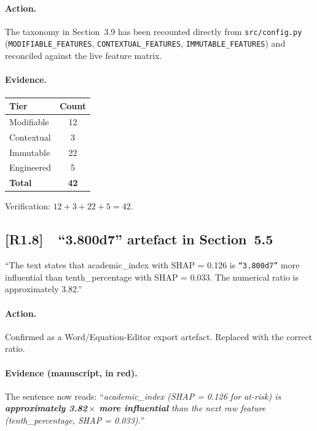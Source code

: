 \documentclass[11pt,a4paper]{article}
\newcommand{\cid}[1]{\textcolor{revred}{\textbf{[#1]}}}
\newcommand{\filebox}[1]{\texttt{\small #1}}
\newcommand{\sectref}[1]{Section~#1}
\newcommand{\stress}[1]{\textbf{#1}}
\begin{document}
\begin{itemize}
\paragraph{Action.} The taxonomy in \sectref{3.9} has been recounted directly from \filebox{src/config.py} (\texttt{MODIFIABLE\_FEATURES}, \texttt{CONTEXTUAL\_FEATURES}, \texttt{IMMUTABLE\_FEATURES}) and reconciled against the live feature matrix.

\paragraph{Evidence.}

\begin{center}\small
\begin{tabular}{l c}
\toprule
\textbf{Tier} & \textbf{Count} \\
\midrule
Modifiable & 12 \\
Contextual & 3 \\
Immutable  & 22 \\
Engineered & 5 \\
\midrule
\stress{Total} & \stress{42} \\
\bottomrule
\end{tabular}
\end{center}

\noindent Verification: $12 + 3 + 22 + 5 = 42$. 

\subsection*{\cid{R1.8}~~``3.800d7'' artefact in \sectref{5.5}}

\begin{reviewerquote}
``The text states that academic\_index with SHAP = 0.126 is \texttt{``3.800d7''} more influential than tenth\_percentage with SHAP = 0.033. The numerical ratio is approximately 3.82.''
\end{reviewerquote}

\paragraph{Action.} Confirmed as a Word/Equation-Editor export artefact. Replaced with the correct ratio.

\paragraph{Evidence (manuscript, in red).} The sentence now reads: ``\textit{academic\_index (SHAP = 0.126 for at-risk) is \stress{approximately 3.82\,$\times$ more influential} than the next raw feature (tenth\_percentage, SHAP = 0.033).}''


\end{itemize}
\end{document}
